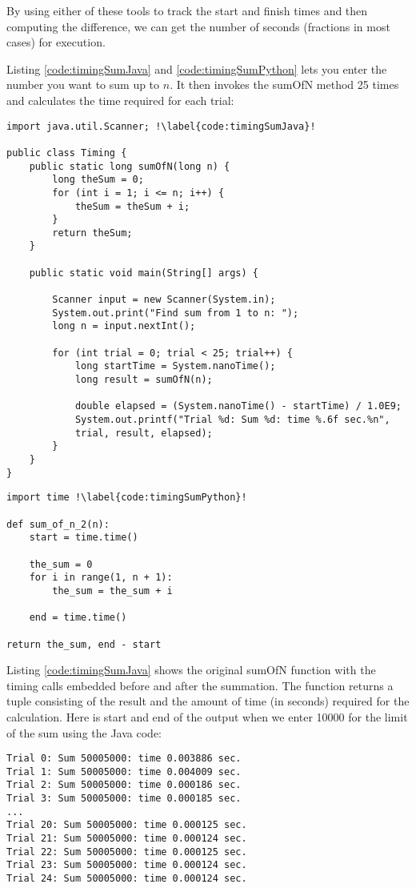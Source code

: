 By using either of these tools to track the start and finish times and then computing the difference, we can get the number of seconds (fractions in most cases) for execution.

Listing \ref{code:timingSumJava} and \ref{code:timingSumPython} lets you enter the number you want to sum up to $n$. It then invokes the sumOfN method 25 times and calculates the time required for each trial:

\begin{verbatim}
import java.util.Scanner; !\label{code:timingSumJava}!

public class Timing {
	public static long sumOfN(long n) {
		long theSum = 0;
		for (int i = 1; i <= n; i++) {
			theSum = theSum + i;
		}
		return theSum;
	}
	
	public static void main(String[] args) {
		
		Scanner input = new Scanner(System.in);
		System.out.print("Find sum from 1 to n: ");
		long n = input.nextInt();
		
		for (int trial = 0; trial < 25; trial++) {
			long startTime = System.nanoTime();
			long result = sumOfN(n);
			
			double elapsed = (System.nanoTime() - startTime) / 1.0E9;
			System.out.printf("Trial %d: Sum %d: time %.6f sec.%n",
			trial, result, elapsed);
		}
	}
}
\end{verbatim}


\begin{verbatim}
import time !\label{code:timingSumPython}!

def sum_of_n_2(n):
	start = time.time()
	
	the_sum = 0
	for i in range(1, n + 1):
		the_sum = the_sum + i
		
	end = time.time()

return the_sum, end - start
\end{verbatim}

Listing \ref{code:timingSumJava} shows the original sumOfN function with the timing calls embedded before and after the summation. The function returns a tuple consisting of the result and the amount of time (in seconds) required for the calculation. Here is start and end of the output when we enter 10000 for the limit of the sum using the Java code:

\begin{verbatim}
Trial 0: Sum 50005000: time 0.003886 sec.
Trial 1: Sum 50005000: time 0.004009 sec.
Trial 2: Sum 50005000: time 0.000186 sec.
Trial 3: Sum 50005000: time 0.000185 sec.
...
Trial 20: Sum 50005000: time 0.000125 sec.
Trial 21: Sum 50005000: time 0.000124 sec.
Trial 22: Sum 50005000: time 0.000125 sec.
Trial 23: Sum 50005000: time 0.000124 sec.
Trial 24: Sum 50005000: time 0.000124 sec.
\end{verbatim}


